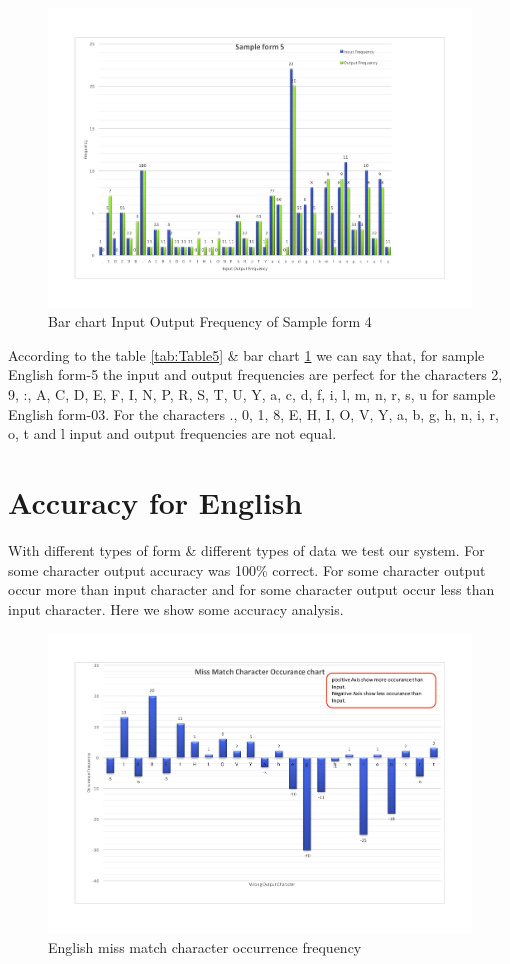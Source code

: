 \begin{figure}[H]
\centering
\includegraphics[width=1\textwidth]{form5.pdf}
\caption {Bar chart Input Output Frequency of Sample form 4}
\label {fig:bar5}
\end{figure}
According to the table \ref{tab:Table5} \& bar chart \ref{fig:bar5} we can say that, for sample English form-5 the input and output frequencies are perfect for the characters 2, 9, :, A, C, D, E, F, I, N, P, R, S, T, U, Y, a, c, d, f, i, l, m, n, r, s, u for sample English form-03. For the characters ., 0, 1, 8, E, H, I, O, V, Y, a, b, g, h, n, i, r, o, t and l input and output frequencies are not equal. 
\section{Accuracy for English}
With different types of form \& different types of data we test our system. For some character output accuracy was 100\% correct. For some character output occur more than input character and for some character output occur less than input character. Here we show some accuracy analysis.

\begin{figure}[H]
\centering
\includegraphics[width=1\textwidth]{EOccurance.pdf}
\caption {English miss match character occurrence frequency}
\label {fig:Accuracy}
\end{figure}

